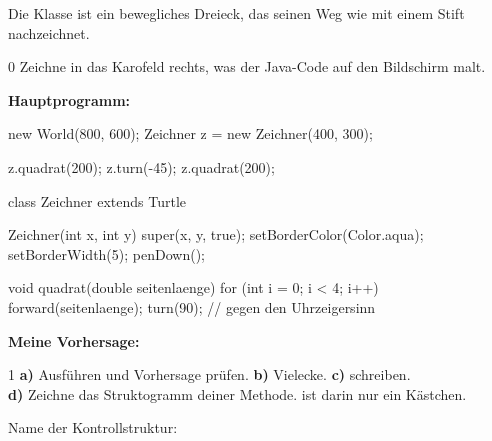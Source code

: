 \documentclass[11pt,a4paper]{article}
\begin{document}

\begin{minipage}[t]{0.44\linewidth}
Die Klasse  ist ein bewegliches Dreieck, das seinen Weg wie mit einem Stift nachzeichnet.
\begin{aufgabe}[Predict]{0}
Zeichne in das Karofeld rechts, was der Java-Code auf den Bildschirm malt.
\end{aufgabe}
\textbf{Hauptprogramm:}
\begin{java}
new World(800, 600);
Zeichner z = new Zeichner(400, 300);

z.quadrat(200);
z.turn(-45);
z.quadrat(200);
\end{java}
\end{minipage}\hfill
\begin{minipage}[t]{0.53\linewidth}
\begin{java}
class Zeichner extends Turtle {

   Zeichner(int x, int y) {
      super(x, y, true);
      setBorderColor(Color.aqua);
      setBorderWidth(5);
      penDown();
   }

   void quadrat(double seitenlaenge) {
      for (int i = 0; i < 4; i++) {
         forward(seitenlaenge);
         turn(90); // gegen den Uhrzeigersinn
      }
   }
}
\end{java}
\textbf{Meine Vorhersage:}\\[1mm]
\end{minipage}

\begin{aufgabe}{1}
\textbf{a)} Ausführen und Vorhersage prüfen. \quad \textbf{b)} Vielecke. \quad \textbf{c)}  schreiben.\\
\textbf{d)} Zeichne das Struktogramm deiner Methode.  ist darin nur ein Kästchen.
\end{aufgabe}
Name der Kontrollstruktur: 
\end{document}
